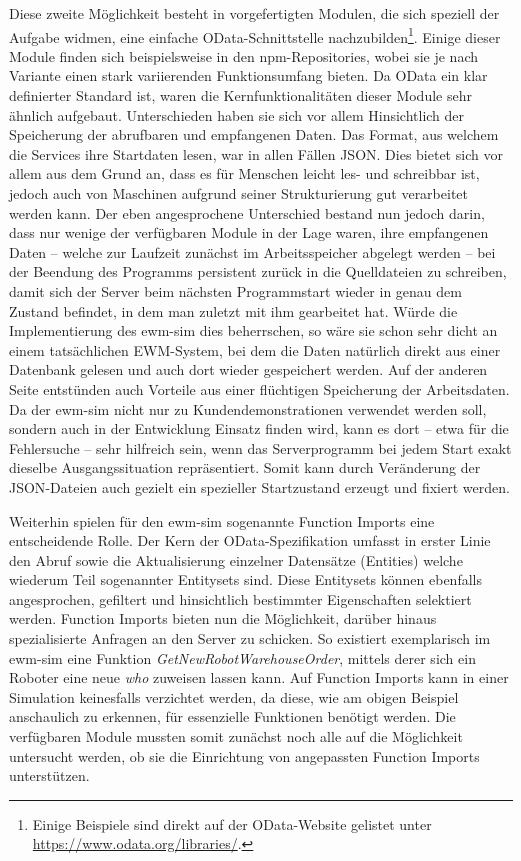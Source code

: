 Diese zweite Möglichkeit besteht in vorgefertigten Modulen, die sich speziell der Aufgabe widmen, eine einfache \ac{OData}-Schnittstelle nachzubilden\footnote{Einige Beispiele sind direkt auf der OData-Website gelistet unter \url{https://www.odata.org/libraries/}.}.
Einige dieser Module finden sich beispielsweise in den \ac{npm}-Repositories, wobei sie je nach Variante einen stark variierenden Funktionsumfang bieten.
Da \ac{OData} ein klar definierter Standard ist, waren die Kernfunktionalitäten dieser Module sehr ähnlich aufgebaut.
Unterschieden haben sie sich vor allem Hinsichtlich der Speicherung der abrufbaren und empfangenen Daten.
Das Format, aus welchem die Services ihre Startdaten lesen, war in allen Fällen \ac{JSON}.
Dies bietet sich vor allem aus dem Grund an, dass es für Menschen leicht les- und schreibbar ist, jedoch auch von Maschinen aufgrund seiner Strukturierung gut verarbeitet werden kann.
Der eben angesprochene Unterschied bestand nun jedoch darin, dass nur wenige der verfügbaren Module in der Lage waren, ihre empfangenen Daten -- welche zur Laufzeit zunächst im Arbeitsspeicher abgelegt werden -- bei der Beendung des Programms persistent zurück in die Quelldateien zu schreiben, damit sich der Server beim nächsten Programmstart wieder in genau dem Zustand befindet, in dem man zuletzt mit ihm gearbeitet hat.
Würde die Implementierung des \ac{ewm-sim} dies beherrschen, so wäre sie schon sehr dicht an einem tatsächlichen \ac{EWM}-System, bei dem die Daten natürlich direkt aus einer Datenbank gelesen und auch dort wieder gespeichert werden.
Auf der anderen Seite entstünden auch Vorteile aus einer flüchtigen Speicherung der Arbeitsdaten.
Da der \ac{ewm-sim} nicht nur zu Kundendemonstrationen verwendet werden soll, sondern auch in der Entwicklung Einsatz finden wird, kann es dort -- etwa für die Fehlersuche -- sehr hilfreich sein, wenn das Serverprogramm bei jedem Start exakt dieselbe Ausgangssituation repräsentiert.
Somit kann durch Veränderung der \ac{JSON}-Dateien auch gezielt ein spezieller Startzustand erzeugt und fixiert werden.

Weiterhin spielen für den \ac{ewm-sim} sogenannte Function Imports eine entscheidende Rolle.
Der Kern der \ac{OData}-Spezifikation umfasst in erster Linie den Abruf sowie die Aktualisierung einzelner Datensätze (Entities) welche wiederum Teil sogenannter Entitysets sind.
Diese Entitysets können ebenfalls angesprochen, gefiltert und hinsichtlich bestimmter Eigenschaften selektiert werden.
Function Imports bieten nun die Möglichkeit, darüber hinaus spezialisierte Anfragen an den Server zu schicken.
So existiert exemplarisch im \ac{ewm-sim} eine Funktion \emph{GetNewRobotWarehouseOrder}, mittels derer sich ein Roboter eine neue \emph{\ac{who}} zuweisen lassen kann.
Auf Function Imports kann in einer Simulation keinesfalls verzichtet werden, da diese, wie am obigen Beispiel anschaulich zu erkennen, für essenzielle Funktionen benötigt werden.
Die verfügbaren Module mussten somit zunächst noch alle auf die Möglichkeit untersucht werden, ob sie die Einrichtung von angepassten Function Imports unterstützen.


